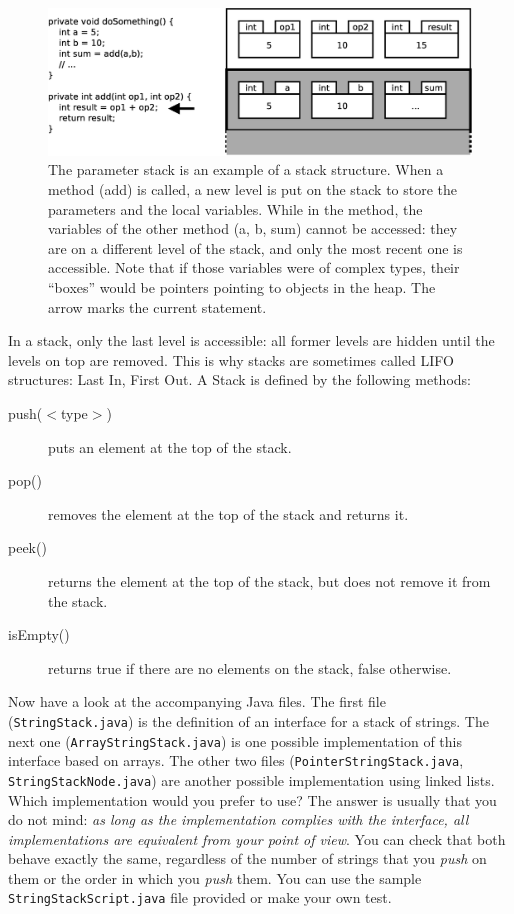\begin{figure}[bthp]
  \centering
  \includegraphics[width=\textwidth]{gfx/parameter-stack}
  \caption{The parameter stack is an example of a stack
    structure. When a method (add) is called, a new level is put on the
    stack to store the parameters and the local variables. While in
    the method, the variables of the other method (a, b, sum) cannot
    be accessed: they are on a different level of the stack, and only
    the most recent one is accessible. Note that if those variables
    were of complex types, their ``boxes'' would be pointers pointing
    to objects in the heap. The arrow marks the current statement.}
  \label{fig:stackparameter}
\end{figure}

In a stack, only the last level is accessible: all former levels are
hidden until the levels on top are removed. This is why stacks are
sometimes called LIFO structures: Last In, First Out. A Stack is
defined by the following methods:

\begin{description}
\item[push($<$type$>$)] puts an element at the top of the stack.
\item[pop() ] removes the element at the top of the
  stack and returns it. 
\item[peek() ] returns the element at the top of the stack, but
  does not remove it from the stack.
\item[isEmpty() ] returns true if there are no elements on the stack,
  false otherwise.
\end{description}

Now have a 
look at the accompanying Java files. 
The first file (\verb+StringStack.java+) is the definition of an
interface for a stack of strings. The next 
one (\verb+ArrayStringStack.java+) is one possible
implementation of this interface based on arrays. The other two files 
(\verb+PointerStringStack.java+, \verb+StringStackNode.java+) are
another possible implementation using linked lists. Which
implementation would you prefer to use? The answer is usually that you
do not mind: \emph{as long as the implementation complies with the
  interface, all implementations are equivalent from your point of
  view}. You can check that both behave exactly the same, regardless
of the number of strings that you \emph{push} on them or 
the order in which you \emph{push} them. You can
use the sample \verb+StringStackScript.java+ file provided or make
your own test.

